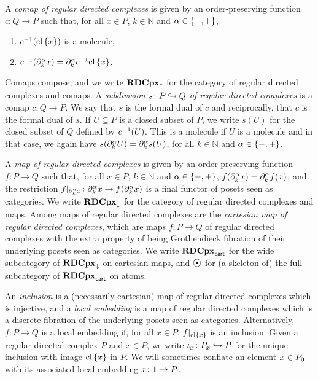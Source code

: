 A \emph{comap of regular directed complexes} is given by an order-preserving function \( c \colon Q \to P \) such that, for all \( x \in P \), \( k \in \mathbb{N} \) and \( \a \in \set{-, +} \), 
\begin{enumerate}
    \item \( \invrs{c}(\clset{x}) \) is a molecule, 
    \item \( \invrs{c}(\bd{k}{\a} x) = \bd{k}{\a} \invrs{c}\clset{x} \).
\end{enumerate}
Comaps compose, and we write \( \rdcpxcomap \) for the category of regular directed complexes and comaps.
A \emph{subdivision \( s \colon P \sd Q \) of regular directed complexes} is a comap \( c \colon Q \to P \).
We say that \( s \) is the formal dual of \( c \) and reciprocally, that \( c \) is the formal dual of \( s \).
If \( U \subseteq P \) is a closed subset of \( P \), we write \( s(U) \) for the closed subset of \( Q \) defined by \( \invrs{c}(U) \).
This is a molecule if \( U \) is a molecule and in that case, we again have \( s(\bd{k}{\a} U) = \bd{k}{\a} s(U) \), for all \( k \in \mathbb{N} \) and \( \a \in \set{-, +} \).

A \emph{map of regular directed complexes} is given by an order-preserving function \( f \colon P \to Q \) such that, for all \( x \in P \), \( k \in \mathbb{N} \) and \( \a \in \set{-, +} \), \( f(\bd{k}{\a}x) = \bd{k}{\a} f(x) \), and the restriction \( \restr{f}{\bd{k}{\a} x} \colon \bd{k}{\a} x \to f(\bd{k}{\a} x) \) is a final functor of posets seen as categories. 
We write \( \rdcpxmap \) for the category of regular directed complexes and maps.
Among maps of regular directed complexes are the \emph{cartesian map of regular directed complexes}, which are maps \( f \colon P \to Q \) of regular directed complexes with the extra property of being Grothendieck fibration of their underlying posets seen as categories.
We write \( \rdcpxcart \) for the wide subcategory of \( \rdcpxmap \) on cartesian maps, and \( \atom \) for (a skeleton of) the full subcategory of \( \rdcpxcart \) on atoms.

An \emph{inclusion} is a (necessarily cartesian) map of regular directed complexes which is injective, and a \emph{local embedding} is a map of regular directed complexes which is a discrete fibration of the underlying posets seen as categories.
Alternatively, \( f \colon P \to Q \) is a local embedding if, for all \( x \in P \), \( \restr{f}{\clset{x}} \) is an inclusion.
Given a regular directed complex \( P \) and \( x \in P \), we write \( \mapel{x} \colon \imel{P}{x} \incl P \) for the unique inclusion with image \( \clset{x} \) in \( P \).
We will sometimes conflate an element \( x \in \gr{0}{P} \) with its associated local embedding \( x \colon \pt \to P \).

